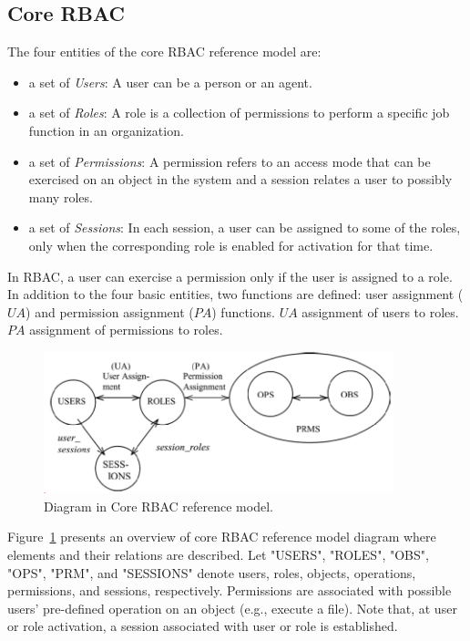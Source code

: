 \subsection{Core RBAC} 

The four entities of the core RBAC reference model are:

\begin{itemize}
\setlength{\itemsep}{0.25pt}
\item a set of \emph{Users}: A user can be a person or an agent.
\item a set of \emph{Roles}: A role is a collection of permissions to perform a specific job function in an organization.
\item a set of \emph{Permissions}: A permission refers to an access mode that can be exercised on an object in the system and a session relates a user to possibly many roles.
\item a set of \emph{Sessions}: In each session, a user can be assigned to some of the roles, only when the corresponding role is enabled for activation for that time.		
\end{itemize}

In RBAC, a user can exercise a permission only if the user is assigned to a role.
In addition to the four basic entities, two functions are defined:
user assignment ($UA$) and permission assignment ($PA$) functions.
$UA$ assignment of users to roles.
$PA$ assignment of permissions to roles.

\begin{figure}[ht]
    \centering
        \includegraphics[width=4.0in]{sections/core-model.png}
    \caption{\label{fig:overview}Diagram in Core RBAC reference model\cite{ferraiolokuhn}.}
\end{figure}

Figure~\ref{fig:overview} presents an overview of core RBAC reference model diagram where elements and their relations are described.
Let "USERS", "ROLES", "OBS", "OPS", "PRM", and "SESSIONS" denote users, roles, objects, operations, permissions, and sessions, respectively.
Permissions are associated with possible users' pre-defined operation on an object (e.g., execute a file).
Note that, at user or role activation, a session associated with user or role is established.

